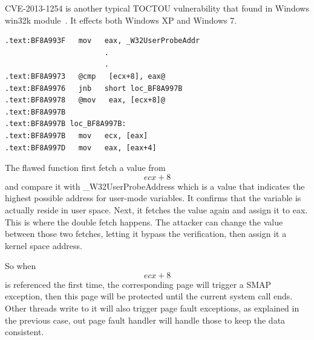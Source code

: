 CVE-2013-1254 is another typical TOCTOU vulnerability that found in Windows win32k module~\cite{jurczyk2013identifying}. It effects both Windows XP and Windows 7. 


\begin{lstlisting}[basicstyle=\small,style=redkeyword] 
.text:BF8A993F   mov   eax, _W32UserProbeAddr
                       .
                       .
.text:BF8A9973   @cmp   [ecx+8], eax@    
.text:BF8A9976   jnb   short loc_BF8A997B
.text:BF8A9978   @mov   eax, [ecx+8]@    
.text:BF8A997B
.text:BF8A997B loc_BF8A997B:                           
.text:BF8A997B   mov   ecx, [eax]
.text:BF8A997D   mov   eax, [eax+4]
\end{lstlisting}

The flawed function first fetch a value from \[ecx+8\] and compare it with \_W32UserProbeAddress which is a value that indicates the highest possible address for user-mode variables. It confirms that the variable is actually reside in user space. Next, it fetches the value again and assign it to eax. This is where the double fetch happens. The attacker can change the value between those two fetches, letting it bypass the verification,  then assign it a kernel space address.

So when \[ecx+8\] is referenced the first time, the corresponding page will trigger a SMAP exception, then this page will be protected until the current system call ends. Other threads write to it will also trigger page fault exceptions, as explained in the previous case, out page fault handler will handle those to keep the data consistent. 


